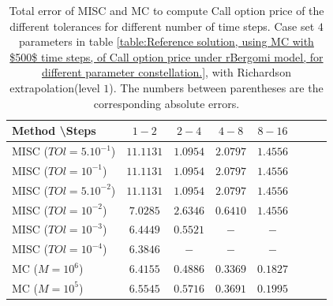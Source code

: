 \documentclass[11pt]{article}
\begin{document}
\begin{table}[h!]
	\centering
	\begin{tabular}{l*{6}{c}r}
		Method \textbackslash  Steps            & $1-2$ & $2-4$ & $4-8$ & $8-16$  \\
		\hline
		MISC ($TOl=5.10^{-1}$)  & $\mathbf{11.1131}$ & $\mathbf{1.0954}$ & $\mathbf{2.0797}$ & $\mathbf{1.4556}$ \\
		MISC ($TOl=10^{-1}$)  & $\mathbf{11.1131}$ & $\mathbf{1.0954}$ & $\mathbf{2.0797}$ & $\mathbf{1.4556}$  \\
		MISC ($TOl=5.10^{-2}$)  & $\mathbf{11.1131}$ & $\mathbf{1.0954}$ & $\mathbf{2.0797}$ & $\mathbf{1.4556}$  \\
		MISC ($TOl=10^{-2}$)  & $\mathbf{7.0285}$ & $\mathbf{2.6346}$ & $\mathbf{0.6410}$ & $\mathbf{1.4556}$  \\	
		MISC ($TOl=10^{-3}$)  & $\mathbf{6.4449}$ & $\mathbf{0.5521}$ & $\mathbf{-}$ & $\mathbf{-}$  \\	
		MISC ($TOl=10^{-4}$)  & $\mathbf{6.3846}$ & $\mathbf{-}$ & $\mathbf{-}$ & $\mathbf{-}$  \\	
		\hline
		MC  ($M=10^6$)   & $\mathbf{6.4155}$  & $\mathbf{0.4886}$  & $\mathbf{0.3369
		}$ & $\mathbf{ 0.1827
		}$  \\	
		MC  ($M=10^5$)   & $\mathbf{6.5545}$  & $\mathbf{0.5716}$  & $\mathbf{0.3691
		}$ & $\mathbf{ 0.1995
		}$  \\			
		\hline
	\end{tabular}
	\caption{Total  error of MISC and MC to compute Call option price of the different tolerances for different number of time steps. Case set $4$ parameters in table \ref{table:Reference solution, using MC with $500$ time steps, of Call option price under rBergomi model, for different parameter constellation.}, with Richardson extrapolation(level $1$). The numbers between parentheses are the corresponding absolute errors.}
	\label{Total  error of MISC and MC to compute Call option price of the different tolerances for different number of time steps. Case set $4$ parameters, with Richardson extrapolation(level $1$). The numbers between parentheses are the corresponding absolute errors.}
\end{table}
\end{document}
